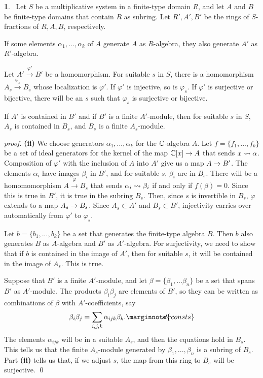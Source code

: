 \documentclass[leqno]{book}
\newcommand\Marginnote[1]{\marginnote{\hspace{-12pt}\normalfont{#1}}}
\theoremstyle{definition}%
\numberwithin{equation}{section}
\theoremstyle{theorem} %
\newtheorem{proposition}[equation]{}
\renewenvironment{proof}{\no \emph{proof.}}{}
\begin{document}
\begin{proposition}{}
\Marginnote{invertjustone}\;\,
Let $S$ be a multiplicative system in a finite-type domain $R$, and
let $A$ and $B$ be finite-type domains that contain $R$ as subring.
Let $R',A',B'$ be the rings of $S$-fractions of $R,A,B$, respectively.

 If some elements $\alpha_1,...,\alpha_k$ of $A$ generate $A$
as $R$-algebra,  they also generate $A'$ as $R'$-algebra.

 Let $A'\stackrel{\varphi'}{\longrightarrow}B'$ be a
homomorphism.  For suitable $s$ in $S$, there is
a homomorphism $A_s\stackrel{\varphi_s}{\longrightarrow}B_s$ whose
localization is $\varphi'$.  If $\varphi'$ is injective, so is
$\varphi_s$.  If $\varphi'$ is surjective or bijective, there will be
an $s$ such that $\varphi_s$ is surjective or bijective.

 If $A'$ is contained in $B'$ and if $B'$ is a finite
$A'$-module, then for suitable $s$ in $S$, $A_s$ is contained in
$B_s$, and $B_s$ is a finite $A_s$-module.
\label{invertjustone}\end{proposition}


\begin{proof}  {\bf (ii)} 
We choose generators $\alpha_1,...,\alpha_k$ for the $\mathbb{C}$-algebra
$A$.  Let $f=\{f_1,...,f_k\}$ be a set of ideal generators for the
kernel of the map $\mathbb{C}[x] \rightarrow A$ that sends $x \rightsquigarrow \alpha$.
Composition of $\varphi'$ with the inclusion of $A$ into $A'$ give us
a map $A \rightarrow B'$.  The elements $\alpha_i$ have images $\beta_i$ in
$B'$, and for suitable $s$, $\beta_i$ are in $B_s$.  There will be a
homomomorphism $A \stackrel\varphi\longrightarrow B_s$ that sends
$\alpha_i \rightsquigarrow\beta_i$ if and only if $f(\beta) = 0$.  Since this is
true in $B'$, it is true in the subring $B_s$.  Then, since $s$ is
invertible in $B_s$, $\varphi$ extends to a map $A_s\rightarrow B_s$. Since
$A_s \subset A'$ and $B_s \subset B'$, injectivity carries over
automatically from $\varphi'$ to $\varphi_s$.

Let $b=\{b_1,...,b_k\}$ be a set that generates the
finite-type algebra $B$.  Then $b$ also generates $B$ as
$A$-algebra and $B'$ as $A'$-algebra.  For surjectivity, we need to
show that if $b$ is contained in the image of $A'$, then for
suitable $s$, it will be contained in the image of $A_s$.  This is
true.

 Suppose that $B'$ is a finite $A'$-module, and let
$\beta = \{\beta_1,...\beta_n\}$ be a set that spans $B'$ as
$A'$-module.  The products $\beta_i\beta_j$ are elements of $B'$, so
they can be written as combinations of $\beta$ with $A'$-coefficients,
say
 \begin{equation}
 \beta_i\beta_j = \sum_{i,j,k}\alpha_{ijk} \beta_k.\Marginnote{strconsts}
 	\label{strconsts}
\end{equation}
The elements $\alpha_{ijk}$ will be in a suitable $A_s$, and then the
equations hold in $B_s$.  This tells us that the finite $A_s$-module
generated by $\beta_1,...,\beta_n$ is a subring of $B_s$.  Part {\bf
  (ii)} tells us that,  if we  adjust $s$, the map
from this ring to $B_s$ will be surjective.  \qed\end{proof}
\end{document}
